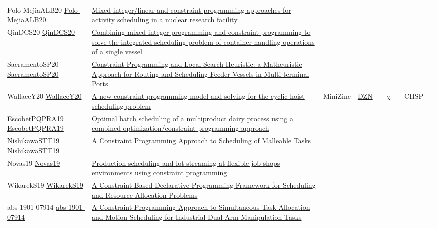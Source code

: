 {\begin{longtable}{p{3cm}p{7cm}lllllll}
Polo-MejiaALB20 \href{https://doi.org/10.1080/00207543.2019.1693654}{Polo-MejiaALB20} &  \href{articles/Polo-MejiaALB20.pdf}{Mixed-integer/linear and constraint programming approaches for activity scheduling in a nuclear research facility} &  &  &  &  &  &  & \\
QinDCS20 \href{https://doi.org/10.1016/j.ejor.2020.02.021}{QinDCS20} &  \href{articles/QinDCS20.pdf}{Combining mixed integer programming and constraint programming to solve the integrated scheduling problem of container handling operations of a single vessel} &  &  &  &  &  &  & \\
SacramentoSP20 \href{https://doi.org/10.1007/s43069-020-00036-x}{SacramentoSP20} &  \href{articles/SacramentoSP20.pdf}{Constraint Programming and Local Search Heuristic: a Matheuristic Approach for Routing and Scheduling Feeder Vessels in Multi-terminal Ports} &  &  &  &  &  &  & \\
WallaceY20 \href{https://doi.org/10.1007/s10601-020-09316-z}{WallaceY20} &  \href{articles/WallaceY20.pdf}{A new constraint programming model and solving for the cyclic hoist scheduling problem} & MiniZinc & \href{https://data.4tu.nl/articles/_/12912413}{DZN} &  & \href{https://data.4tu.nl/articles/_/12912413}{y} &  & CHSP & \\
EscobetPQPRA19 \href{https://doi.org/10.1016/j.compchemeng.2018.08.040}{EscobetPQPRA19} &  \href{articles/EscobetPQPRA19.pdf}{Optimal batch scheduling of a multiproduct dairy process using a combined optimization/constraint programming approach} &  &  &  &  &  &  & \\
NishikawaSTT19 \href{http://www.ijnc.org/index.php/ijnc/article/view/201}{NishikawaSTT19} &  \href{articles/NishikawaSTT19.pdf}{A Constraint Programming Approach to Scheduling of Malleable Tasks} &  &  &  &  &  &  & \\
Novas19 \href{https://doi.org/10.1016/j.cie.2019.07.011}{Novas19} &  \href{articles/Novas19.pdf}{Production scheduling and lot streaming at flexible job-shops environments using constraint programming} &  &  &  &  &  &  & \\
WikarekS19 \href{https://doi.org/10.1142/S2196888819500027}{WikarekS19} &  \href{articles/WikarekS19.pdf}{A Constraint-Based Declarative Programming Framework for Scheduling and Resource Allocation Problems} &  &  &  &  &  &  & \\
abs-1901-07914 \href{http://arxiv.org/abs/1901.07914}{abs-1901-07914} &  \href{articles/abs-1901-07914.pdf}{A Constraint Programming Approach to Simultaneous Task Allocation and Motion Scheduling for Industrial Dual-Arm Manipulation Tasks} &  &  &  &  &  &  & \\

\end{longtable}}
